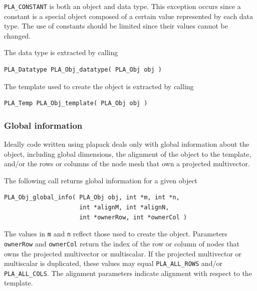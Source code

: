 {\tt PLA\_CONSTANT} is both an object and data type.  
This exception occurs since a constant is a special object
composed of a certain value represented by each data type.
The use of constants should be limited since their values
cannot be changed.

The data type is extracted by calling
\begin{FlaSpec}
\begin{verbatim}
PLA_Datatype PLA_Obj_datatype( PLA_Obj obj )
\end{verbatim}
\end{FlaSpec}

The template used to create the object is extracted by calling
\begin{FlaSpec}
\begin{verbatim}
PLA_Temp PLA_Obj_template( PLA_Obj obj )
\end{verbatim}
\end{FlaSpec}


\subsubsection{Global information}

Ideally code written using plapack deals only with
global information about the object, including global
dimensions, the alignment of the object to the template,
and/or the rows or columns of the node mesh that own a projected
multivector.  

The following call returns global information for a given object
\begin{FlaSpec}
\begin{verbatim}
PLA_Obj_global_info( PLA_Obj obj, int *m, int *n,
                     int *alignM, int *alignN,
                     int *ownerRow, int *ownerCol )
\end{verbatim}
\end{FlaSpec}
The values in {\tt m} and {\tt n} reflect those used to create the object.
Parameters {\tt ownerRow} and {\tt ownerCol} return the index of the row or column
of nodes that owns the projected multivector or multiscalar.  If the projected
multivector or multiscalar is duplicated, these values may equal 
{\tt PLA\_ALL\_ROWS} and/or {\tt PLA\_ALL\_COLS}.  
The alignment parameters indicate alignment with respect to the template.

